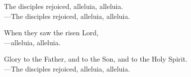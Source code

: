 \responsory

\noindent The disciples rejoiced, alleluia, alleluia.\\
{\color{red}---\thinspace}The disciples rejoiced, alleluia, alleluia.

\medskip\noindent When they saw the risen Lord,\\
{\color{red}---\thinspace}alleluia, alleluia.

\medskip\noindent Glory to the Father, and to the Son, and to the Holy Spirit.\\
{\color{red}---\thinspace}The disciples rejoiced, alleluia, alleluia.